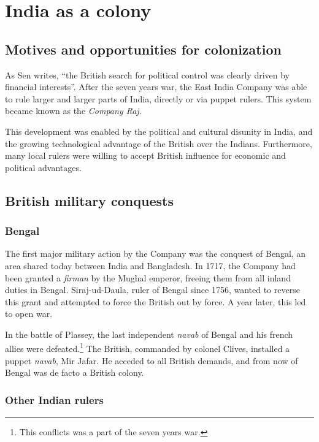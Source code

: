 \documentclass[11pt, a4paper, headings=standardclasses]{scrartcl}
\begin{document}
\section{India as a colony}

\subsection{Motives and opportunities for colonization}

As Sen writes, ``the British search for political control was clearly driven by financial interests''\autocite[Section 3]{tnr}. After the seven years war, the East India Company was able to rule larger and larger parts of India, directly or via puppet rulers. This system became known as the \textit{Company Raj}.\autocite{parliament}

This development was enabled by the political and cultural disunity in India, and the growing technological advantage of the British over the Indians. Furthermore, many local rulers were willing to accept British influence for economic and political advantages.

\subsection{British military conquests}

\subsubsection{Bengal}
The first major military action by the Company was the conquest of Bengal, an area shared today between India and Bangladesh. In 1717, the Company had been granted a \textit{firman} by the Mughal emperor, freeing them from all inland duties in Bengal.\autocite[257]{RF} Siraj-ud-Daula, ruler of Bengal since 1756, wanted to reverse this grant and attempted to force the British out by force. A year later, this led to open war.\autocite[258]{RF}

In the battle of Plassey, the last independent \textit{navab} of Bengal and his french allies were defeated.\footnote{This conflicts was a part of the seven years war.} The British, commanded by colonel Clives, installed a puppet \textit{navab}, Mir Jafar. He acceded to all British demands, and from now of Bengal was de facto a British colony.\autocite[268]{RF}

\subsubsection{Other Indian rulers}
\end{document}
